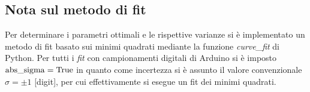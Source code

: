 \documentclass{article}[a4paper, oneside ,11pt]
\begin{document}
\subsection*{Nota sul metodo di fit}
Per determinare i parametri ottimali e le rispettive varianze si \`e implementato un metodo di fit basato sui minimi quadrati mediante la funzione \emph{curve\_fit} di Python.
Per tutti i \emph{fit} con campionamenti digitali di Arduino si è imposto $\rm{abs\_sigma} = \rm True$ in quanto come incertezza si è assunto il valore convenzionale $\sigma = \pm 1$ [digit], per cui effettivamente si esegue un fit dei minimi quadrati.\\
\medskip


\end{document}

